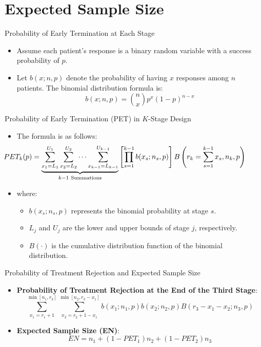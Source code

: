 \documentclass[xcolor=red]{beamer}
\begin{document}
\section{Expected Sample Size}
\begin{frame}{Probability of Early Termination at Each Stage}
\begin{itemize}
    \item Assume each patient's response is a binary random variable with a success probability of \( p \).
    \item Let \( b(x; n, p) \) denote the probability of having \( x \) responses among \( n \) patients. The binomial distribution formula is:
    \[
    b(x; n, p) = \binom{n}{x} p^x (1 - p)^{n - x}
    \]
\end{itemize}
\end{frame}


\begin{frame}{Probability of Early Termination (PET) in \( K \)-Stage Design}
\begin{itemize}
        \item The formula is as follows:
        \[
        \hspace{-1.5cm}
        PET_k(p) = 
		\underbrace{
    	\sum_{x_1 = L_1}^{U_1} \sum_{x_2 = L_2}^{U_2} \cdots \sum_{x_{k-1} = L_{k-1}}^{U_{k-1}}
		}_{k-1 \text{ Summations}}
		\left[ \prod_{s=1}^{k-1} b(x_s; n_s, p) \right]
		B\left( r_k = \sum_{s=1}^{k-1} x_s, n_k, p \right)
		\]
        \item \scriptsize
        where:
	\begin{itemize}
            \item \( b(x_s; n_s, p) \) represents the binomial probability at stage \( s \).
            \item \( L_j \) and \( U_j \) are the lower and upper bounds of stage \( j \), respectively.
            \item \( B(\cdot) \) is the cumulative distribution function of the binomial distribution.
    \end{itemize}
\end{itemize}
\end{frame}


\begin{frame}{Probability of Treatment Rejection and Expected Sample Size}
\begin{itemize}
    \item \textbf{Probability of Treatment Rejection at the End of the Third Stage}:
    \[
    \sum_{x_1 = r_1 + 1}^{\min[n_1, r_3]} \sum_{x_2 = r_2 + 1 - x_1}^{\min[n_2, r_3 - x_1]} b(x_1; n_1, p) b(x_2; n_2, p) B(r_3 - x_1 - x_2; n_3, p)
    \]
    \item \textbf{Expected Sample Size (EN)}:
    \[
    EN = n_1 + (1 - PET_1) n_2 + (1 - PET_{\text{2}}) n_3
    \]
\end{itemize}
\end{frame}
\end{document}
